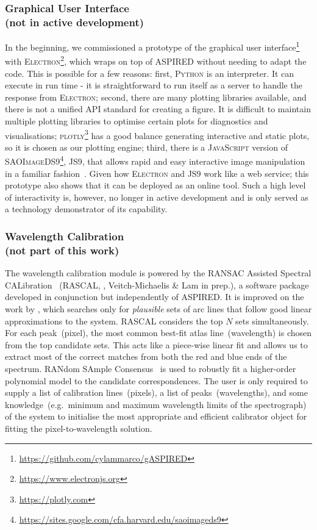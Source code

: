 \documentclass[linenumbers, twocolumn]{aastex631}
\begin{document}
\subsubsection*{Graphical User Interface\\(not in active development)}
In the beginning, we commissioned a prototype of the graphical user
interface\footnote{\url{https://github.com/cylammarco/gASPIRED}} with
\textsc{Electron}\footnote{\url{https://www.electronjs.org}}, which wraps on
top of \textsc{ASPIRED} without needing to adapt the code. This is
possible for a few reasons: first, \textsc{Python} is an interpreter. It can
execute in run time - it is straightforward to run itself as a server to handle
the response from \textsc{Electron}; second, there are many plotting libraries
available, and there is not a unified API standard for creating a figure. It
is difficult to maintain multiple plotting libraries to optimise certain plots
for diagnostics and visualisations; \textsc{plotly}\footnote{\url{https://plotly.com}}
has a good balance generating interactive and static plots, so it is chosen as
our plotting engine; third, there is a \textsc{JavaScript} version of
\textsc{SAOImageDS9}\footnote{\url{https://sites.google.com/cfa.harvard.edu/saoimageds9}}, \textsc{JS9},
that allows rapid and easy interactive image manipulation in a familiar
fashion~\citep{2003ASPC..295..489J, eric_mandel_2022_6675771}. Given how
\textsc{Electron} and \textsc{JS9} work like a web service; this prototype also
shows that it can  be deployed as an online tool. Such a high level of
interactivity is, however, no longer in active development and is only served
as a technology demonstrator of its capability.

\subsubsection*{Wavelength Calibration\\(not part of this work)}
The wavelength calibration module is powered by the RANSAC Assisted Spectral CALibration
~(\textsc{RASCAL}, \citealt{2020zndo...4117517V, 2020ASPC..527..627V}, Veitch-Michaelis
\& Lam in prep.), a software package developed in conjunction but independently of \textsc{ASPIRED}.
It is improved on the work by \citet{2018ApOpt..57.6876S}, which searches only for
\textit{plausible} sets of arc lines that follow good linear approximations to the
system. \textsc{RASCAL} considers the top $N$ sets simultaneously. For each peak~(pixel),
the most common best-fit atlas line~(wavelength) is chosen from the top candidate
sets. This acts like a piece-wise linear fit and allows us to extract most of
the correct matches from both the red and blue ends of the spectrum. RANdom
SAmple Consensus~\citep[RANSAC,][]{fischler_bolles_1981} is used to robustly
fit a higher-order polynomial model to the candidate correspondences. The user
is only required to supply a list of calibration lines~(pixels), a
list of peaks~(wavelengths), and some knowledge~(e.g.\ minimum and maximum
wavelength limits of the spectrograph) of
the system to initialise the most appropriate and efficient calibrator object for
fitting the pixel-to-wavelength solution.
\end{document}
